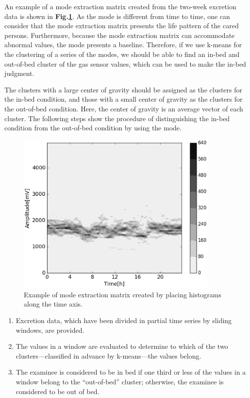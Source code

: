 \documentclass[publish,JRM,paper]{jaciiiarticle}
\begin{document}
An example of a mode extraction matrix created from the two-week excretion data is shown in {\bf Fig.\ref{hist-spectrogram}}. As the mode is different from time to time, one can consider that the mode extraction matrix presents the life pattern of the cared persons. Furthermore, because the mode extraction matrix can accommodate abnormal values, the mode presents a baseline. Therefore, if we use k-means for the clustering of a series of the modes, we should be able to find an in-bed and out-of-bed cluster of the gas sensor values, which can be used to make the in-bed judgment.

The clusters with a large center of gravity should be assigned as the clusters for the in-bed condition, and those with a small center of gravity as the clusters for the out-of-bed condition. Here, the center of gravity is an average vector of each cluster. The following steps show the procedure of distinguishing the in-bed condition from the out-of-bed condition by using the mode.

\begin{figure}[t]
\centering
\includegraphics[width=10cm]{./fig/C_matrix.eps}
\caption{Example of mode extraction matrix created by placing histograms along the time axis.}
\label{hist-spectrogram}
\end{figure}

\begin{enumerate}
\item Excretion data, which have been divided in partial time series by sliding windows, are provided.
\item The values in a window are evaluated to determine to which of the two clusters—classified in advance by k-means—the values belong.
\item The examinee is considered to be in bed if one third or less of the values in a window belong to the “out-of-bed” cluster; otherwise, the examinee is considered to be out of bed.
\end{enumerate}
\end{document}
